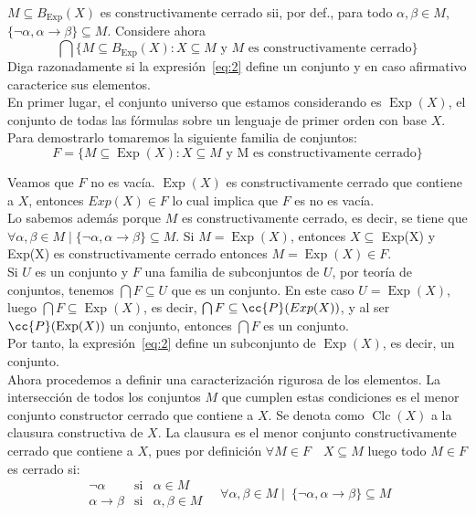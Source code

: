 \documentclass[12pt]{article}
\DeclareMathOperator{\Exp}{Exp}
\DeclareMathOperator{\Clc}{Clc}
\begin{document}
\newpage
\setcounter{ejercicio}{0}

\begin{ejercicio}
    $M \subseteq B_{\Exp}(X)$ es constructivamente cerrado sii, por def., para todo $\alpha, \beta \in M$, $\{\neg \alpha, \alpha \rightarrow \beta\} \subseteq M$.
    Considere ahora
    \begin{equation}\label{eq:2}
        \bigcap \{M \subseteq B_{\Exp}(X): X \subseteq M \text{ y } M \text{ es constructivamente cerrado}\}
    \end{equation}
    Diga razonadamente si la expresión~\eqref{eq:2} define un conjunto y en caso afirmativo caracterice sus elementos.\\

    En primer lugar, el conjunto universo que estamos considerando es $\Exp(X)$, el conjunto de todas las fórmulas sobre un lenguaje de primer orden con base $X$. \\

    Para demostrarlo tomaremos la siguiente familia de conjuntos:
    \[
        F=\{M \subseteq \Exp(X) : X \subseteq M \text{ y M es constructivamente cerrado}\}
    \]

    Veamos que $F$ no es vacía. $\Exp(X)$ es constructivamente cerrado que contiene a $X$, entonces $Exp(X) \in F$ lo cual implica que $F$ es no es vacía. \\

    Lo sabemos además porque $M$ es constructivamente cerrado, es decir, se tiene que $\forall \alpha, \beta \in M \mid \{\lnot \alpha, \alpha \rightarrow \beta\} \subseteq M$.
    Si $M=\Exp(X)$, entonces $X \subseteq $ Exp(X) y Exp(X) es constructivamente cerrado entonces $M=\Exp(X) \in F$. \\ 


    Si $U$ es un conjunto y $F$ una familia de subconjuntos de $U$, por teoría de conjuntos, tenemos $\bigcap F \subseteq U$ que es un conjunto. En este caso $U = \Exp(X)$, luego $\bigcap F \subseteq \Exp(X)$, es decir, $\bigcap F \subseteq \cc{P}(Exp(X))$, y al ser $\cc{P}(\Exp(X))$ un conjunto, entonces $\bigcap F$ es un conjunto. \\

Por tanto, la expresión~\eqref{eq:2} define un subconjunto de $\Exp(X)$, es decir, un conjunto. \\


Ahora procedemos a definir una caracterización rigurosa de los elementos.  
La intersección de todos los conjuntos $M$ que cumplen estas condiciones es el
menor conjunto constructor cerrado que contiene a $X$. 
Se denota como $\Clc(X)$ a la clausura constructiva de $X$.
La clausura es el menor conjunto constructivamente cerrado que contiene a $X$,
pues por definición $\forall M \in F \quad X \subseteq M$ luego todo $M \in F$ es cerrado 
si: 
\[
\begin{array}{lcl}
\lnot \alpha & \text{si} & \alpha \in M \\
\alpha \rightarrow \beta & \text{si} & \alpha, \beta \in M
\end{array}
\quad
\forall \alpha, \beta \in M \mid\ \{\lnot \alpha, \alpha \rightarrow \beta\} \subseteq M
\]


\end{ejercicio}
\end{document}
